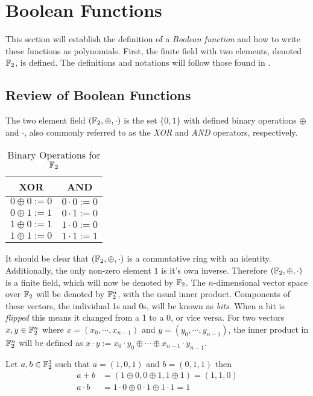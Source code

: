 \section{Boolean Functions}
\par This section will establish the definition of a {\em Boolean function}
and how to write these functions as polynomials. First, the finite field
with two elements, denoted $\mathbb{F}_2$, is defined. The definitions and
notations will follow those found in \cite{bk:cs09}.

\subsection{Review of Boolean Functions}
\par The two element field $(\mathbb{F}_2,\oplus,\cdot)$ is the set $\{0,1\}$
with defined binary operations $\oplus$ and $\cdot$, also commonly referred
to as the {\em XOR} and {\em AND} operators, respectively.
\begin{table}[h!]
	\centering
	\begin{tabular}{|c|c|}
		\hline
		XOR&AND\\
		\hline
		$0\oplus0:=0$&$0\cdot0:=0$\\
		$0\oplus1:=1$&$0\cdot1:=0$\\
		$1\oplus0:=1$&$1\cdot0:=0$\\
		$1\oplus1:=0$&$1\cdot1:=1$\\
		\hline
	\end{tabular}
	\caption{Binary Operations for $\mathbb{F}_2$}
  \label{tab:GF(2)}
\end{table}
\par It should be clear that $(\mathbb{F}_2,\oplus,\cdot)$ is a commutative ring
with an identity. Additionally, the only non-zero element $1$ is it's own
inverse. Therefore $(\mathbb{F}_2,\oplus,\cdot)$ is a finite field, which will now
be denoted by $\mathbb{F}_2$. The $n$-dimensional vector space over $\mathbb{F}_2$ will
be denoted by $\mathbb{F}_2^n$, with the usual inner product. Components of these
vectors, the individual 1s and 0s, will be known as {\em bits}. When a bit
is {\em flipped} this means it changed from a 1 to a 0, or vice versa.
For two vectors $x,y\in\mathbb{F}_2^n$ where $x=(x_0,\cdots,x_{n-1})$ and
$y=(y_0,\cdots,y_{n-1})$, the inner product in $\mathbb{F}_2^n$ will be defined
as $x\cdot y:=\allowbreak x_0\cdot y_0 \oplus\allowbreak
\cdots \oplus\allowbreak x_{n-1}\cdot y_{n-1}$.

\begin{example}
	Let $a,b\in\mathbb{F}_2^3$ such that $a=(1,0,1)$ and $b=(0,1,1)$ then
	\begin{align*}
		a+b      &=(1\oplus0,0\oplus1,1\oplus1)=(1,1,0) \\
		a\cdot b &=1\cdot0\oplus0\cdot1\oplus1\cdot1=1
	\end{align*}
\end{example}

